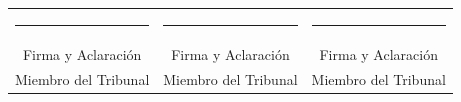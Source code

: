 \documentclass[spanish,a4paper,oneside,12pt,openright]{book}
\begin{document}
\vspace{4cm}
\begin{center}
\begin{tabular}{ccc}
\rule{3.5cm}{0.4pt} & \rule{3.5cm}{0.4pt} & \rule{3.5cm}{0.4pt} \\[0.2cm]
Firma y Aclaración & Firma y Aclaración & Firma y Aclaración \\
Miembro del Tribunal & Miembro del Tribunal & Miembro del Tribunal
\end{tabular}
\end{center}

\clearpage
\thispagestyle{empty}
\mbox{}
\clearpage
\end{document}
